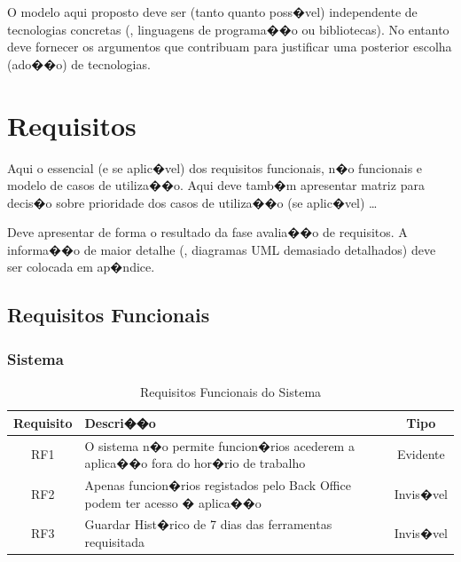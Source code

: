 O modelo aqui proposto deve ser (tanto quanto poss�vel) independente de tecnologias 
concretas (\eg, linguagens de programa��o ou bibliotecas). No entanto deve fornecer os argumentos que contribuam para 
justificar uma posterior escolha (ado��o) de tecnologias.


\section{Requisitos}
\label{sec:requisitos}

Aqui o essencial (e se aplic�vel) dos requisitos funcionais, n�o funcionais e modelo de casos de 
utiliza��o. Aqui deve tamb�m apresentar matriz para decis�o sobre prioridade dos casos de utiliza��o
 (se aplic�vel) \ldots

Deve apresentar de forma  o resultado da fase avalia��o de requisitos. 
A informa��o de maior detalhe (\eg, diagramas UML demasiado detalhados) deve ser colocada em ap�ndice.

\subsection{Requisitos Funcionais}


\subsubsection{Sistema}


\begin{table}[H]
\centering
\begin{tabular}{|c|p{9cm}|c|}
\hline
\textbf{Requisito} & \textbf{Descri��o} & \textbf{Tipo} \\
\hline
RF1 & O sistema n�o permite funcion�rios acederem a aplica��o fora do hor�rio de trabalho & Evidente \\
\hline
RF2 & Apenas funcion�rios registados pelo Back Office podem ter acesso � aplica��o & Invis�vel \\
\hline
RF3 & Guardar Hist�rico de 7 dias das ferramentas requisitada & Invis�vel \\
\hline
\end{tabular}
\caption{Requisitos Funcionais do Sistema}
\label{tab:req_fun_sis}
\end{table}

